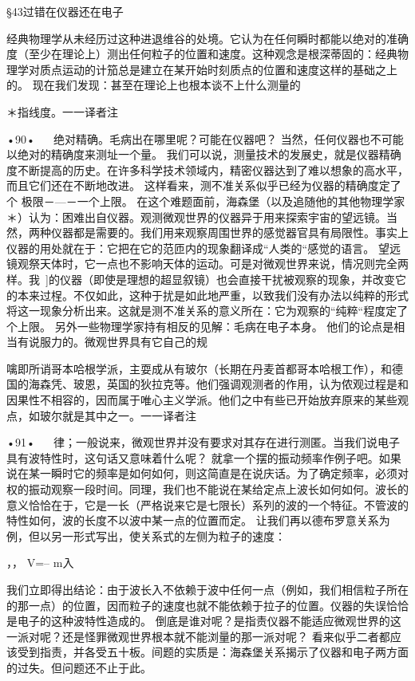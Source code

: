 §43过错在仪器还在电子

经典物理学从未经历过这种进退维谷的处境。它认为在任何瞬时都能以绝对的准确度（至少在理论上）测出任何粒子的位置和速度。这种观念是根深蒂固的：经典物理学对质点运动的计笳总是建立在某开始时刻质点的位置和速度这样的基础之上的。
现在我们发现：甚至在理论上也根本谈不上什么测量的

＊指线度。一一译者注

•90•
  
绝对精确。毛病出在哪里呢？可能在仪器吧？
当然，任何仪器也不可能以绝对的精确度来测址一个量。
我们可以说，测量技术的发展史，就是仪器精确度不断提高的历史。在许多科学技术领域内，精密仪器达到了难以想象的高水平，而且它们还在不断地改进。
这样看来，测不准关系似乎已经为仪器的精确度定了个
极限－—－一个上限。
在这个难题面前，海森堡（以及追随他的其他物理学家＊）认为：困难出自仪器。观测微观世界的仪器异于用来探索宇宙的望远镜。当然，两种仪器都是需要的。我们用来观察周围世界的感觉器官具有局限性。事实上仪器的用处就在于：它把在它的范匝内的现象翻译成“人类的“感觉的语言。
望远镜观祭天体时，它一点也不影响天体的运动。可是对微观世界来说，情况则完全两样。我~]的仪器（即使是理想的超显叙镜）也会直接干扰被观察的现象，并改变它的本来过桯。不仅如此，这种于扰是如此地严重，以致我们没有办法以纯粹的形式将这一现象分析出来。这就是测不准关系的意义所在：它为观察的“纯粹“程度定了个上限。
另外一些物理学家持有相反的见解：毛病在电子本身。
他们的论点是相当有说服力的。微观世界具有它自己的规

噙即所诮哥本哈根学派，主耍成从有玻尔（长期在丹麦首都哥本哈根工作），和德国的海森凭、玻恩，英国的狄拉克等。他们强调观测者的作用，认为侬观过程是和因果性不相容的，因而属于唯心主义学派。他们之中有些已开始放弃原来的某些观点，如玻尔就是其中之一。一一译者注

•91•
  
律；一般说来，微观世界并没有要求对其存在进行测匿。当我们说电子具有波特性时，这句话又意味着什么呢？
就拿一个摆的振动频率作例子吧。如果说在某一瞬时它的频率是如何如何，则这简直是在说庆话。为了确定频率，必须对权的振动观察一段时间。同理，我们也不能说在某给定点上波长如何如何。波长的意义恰恰在于，它是一长（严格说来它是七限长）系列的波的一个特征。不管波的特性如何，波的长度不以波中某一点的位置而定。
让我们再以德布罗意关系为例，但以另一形式写出，使关系式的左侧为粒子的速度：

，，
V=--
m入

我们立即得出结论：由于波长入不依赖于波中任何一点（例如，我们相信粒子所在的那一点）的位置，因而粒子的速度也就不能依赖于拉子的位置。仪器的失误恰恰是电子的这种波特性造成的。
倒底是谁对呢？是指责仪器不能适应微观世界的这一派对呢？还是怪罪微观世界根本就不能浏量的那一派对呢？
看来似乎二者都应该受到指责，并各受五十板。间题的实质是：海森堡关系揭示了仪器和电子两方面的过失。但问题还不止于此。


